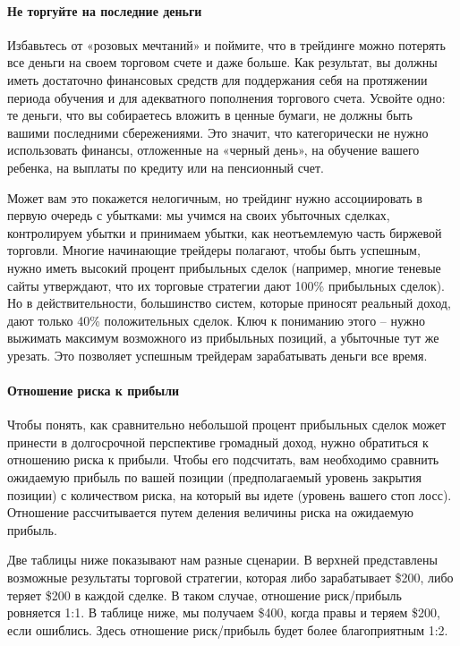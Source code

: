 \documentclass[a5paper]{article}
\begin{document}
\paragraph{Не торгуйте на последние деньги}

Избавьтесь от «розовых мечтаний» и поймите, что в трейдинге можно потерять все деньги на своем торговом счете и даже больше. Как результат, вы должны иметь достаточно финансовых средств для поддержания себя на протяжении периода обучения и для адекватного пополнения торгового счета. Усвойте одно: те деньги, что вы собираетесь вложить в ценные бумаги, не должны быть вашими последними сбережениями. Это значит, что категорически не нужно использовать финансы, отложенные на «черный день», на обучение вашего ребенка, на выплаты по кредиту или на пенсионный счет.

Может вам это покажется нелогичным, но трейдинг нужно ассоциировать в
первую очередь с убытками: мы учимся на своих убыточных сделках,
контролируем убытки и принимаем убытки, как неотъемлемую часть
биржевой торговли. Многие начинающие трейдеры полагают, чтобы быть
успешным, нужно иметь высокий процент прибыльных сделок (например,
многие теневые сайты утверждают, что их торговые стратегии дают 100\% прибыльных сделок). Но в действительности, большинство систем, которые приносят реальный доход, дают только 40\% положительных сделок. Ключ к пониманию этого – нужно выжимать максимум возможного из прибыльных позиций, а убыточные тут же урезать. Это позволяет успешным трейдерам зарабатывать деньги все время.

\paragraph{Отношение риска к прибыли}

Чтобы понять, как сравнительно небольшой процент прибыльных сделок может принести в долгосрочной перспективе громадный доход, нужно обратиться к отношению риска к прибыли. Чтобы его подсчитать, вам необходимо сравнить ожидаемую прибыль по вашей позиции (предполагаемый уровень закрытия позиции) с количеством риска, на который вы идете (уровень вашего стоп лосс). Отношение рассчитывается путем деления величины риска на ожидаемую прибыль.

Две таблицы ниже показывают нам разные сценарии. В верхней представлены возможные результаты торговой стратегии, которая либо зарабатывает \$200, либо теряет \$200 в каждой сделке. В таком случае, отношение риск/прибыль ровняется 1:1. В таблице ниже, мы получаем \$400, когда правы и теряем \$200, если ошиблись. Здесь отношение риск/прибыль будет более благоприятным 1:2.
\end{document}
